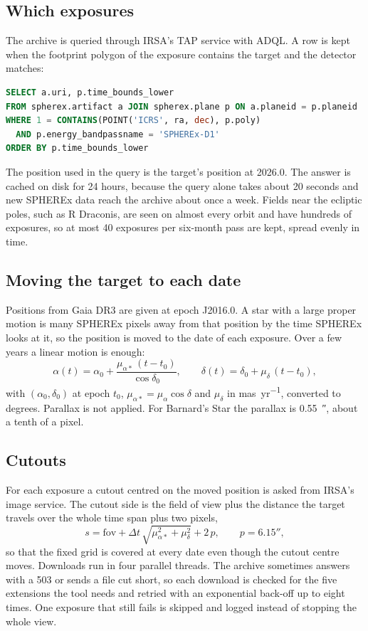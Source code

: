 \documentclass[11pt,a4paper]{article}
\begin{document}
\subsection{Which exposures}
The archive is queried through IRSA's TAP service with ADQL. A row is kept when the footprint
polygon of the exposure contains the target and the detector matches:
\begin{lstlisting}[language=SQL]
SELECT a.uri, p.time_bounds_lower
FROM spherex.artifact a JOIN spherex.plane p ON a.planeid = p.planeid
WHERE 1 = CONTAINS(POINT('ICRS', ra, dec), p.poly)
  AND p.energy_bandpassname = 'SPHEREx-D1'
ORDER BY p.time_bounds_lower
\end{lstlisting}
The position used in the query is the target's position at 2026.0. The answer is cached on
disk for 24 hours, because the query alone takes about 20 seconds and new SPHEREx data reach
the archive about once a week. Fields near the ecliptic poles, such as R Draconis, are seen on
almost every orbit and have hundreds of exposures, so at most 40 exposures per six-month pass
are kept, spread evenly in time.

\subsection{Moving the target to each date}
Positions from Gaia DR3 are given at epoch J2016.0. A star with a large proper motion is many
SPHEREx pixels away from that position by the time SPHEREx looks at it, so the position is
moved to the date of each exposure. Over a few years a linear motion is enough:
\begin{equation}
  \alpha(t) = \alpha_0 + \frac{\mu_{\alpha*}\,(t - t_0)}{\cos\delta_0},
  \qquad
  \delta(t) = \delta_0 + \mu_\delta\,(t - t_0),
\end{equation}
with $(\alpha_0,\delta_0)$ at epoch $t_0$, $\mu_{\alpha*} = \mu_\alpha\cos\delta$ and
$\mu_\delta$ in \si{mas.yr^{-1}}, converted to degrees. Parallax is not applied. For Barnard's
Star the parallax is \SI{0.55}{\arcsecond}, about a tenth of a pixel.

\subsection{Cutouts}
For each exposure a cutout centred on the moved position is asked from IRSA's image service.
The cutout side is the field of view plus the distance the target travels over the whole time
span plus two pixels,
\begin{equation}
  s = \mathrm{fov} + \Delta t \, \sqrt{\mu_{\alpha*}^2 + \mu_\delta^2} + 2\,p,
  \qquad p = \ang{;;6.15},
\end{equation}
so that the fixed grid is covered at every date even though the cutout centre moves.
Downloads run in four parallel threads. The archive sometimes answers with a 503 or sends a
file cut short, so each download is checked for the five extensions the tool needs and retried
with an exponential back-off up to eight times. One exposure that still fails is skipped and
logged instead of stopping the whole view.
\end{document}
